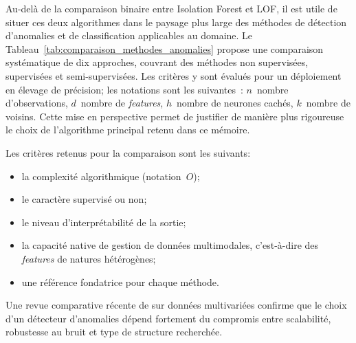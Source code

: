 Au-delà de la comparaison binaire entre Isolation Forest et LOF, il est utile de situer ces
deux algorithmes dans le paysage plus large des méthodes de détection d'anomalies et de
classification applicables au domaine. Le Tableau~\ref{tab:comparaison_methodes_anomalies}
propose une comparaison systématique de dix approches, couvrant des méthodes non supervisées,
supervisées et semi-supervisées. Les critères y sont évalués pour un déploiement en
élevage de précision; les notations sont les suivantes~: $n$~nombre d'observations,
$d$~nombre de \textit{features}, $h$~nombre de neurones cachés, $k$~nombre de voisins.
Cette mise en perspective permet de justifier de manière plus rigoureuse le choix de
l'algorithme principal retenu dans ce mémoire.

Les critères retenus pour la comparaison sont les suivants:
\begin{itemize}
    \item la complexité algorithmique (notation~$O$);
    \item le caractère supervisé ou non;
    \item le niveau d'interprétabilité de la sortie;
    \item la capacité native de gestion de données multimodales, c'est-à-dire des
    \textit{features} de natures hétérogènes;
    \item une référence fondatrice pour chaque méthode.
\end{itemize}

Une revue comparative récente de \cite{goldstein2016comparative} sur données multivariées
confirme que le choix d'un détecteur d'anomalies dépend fortement du compromis entre
scalabilité, robustesse au bruit et type de structure recherchée.


